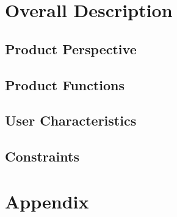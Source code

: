 \documentclass[a4paper,12pt]{report}
\begin{document}
\chapter{Overall Description}
\label{ch:Overall Description}

\section{Product Perspective}


\section{Product Functions}


\section{User Characteristics}


\section{Constraints}


\appendix
\chapter{Appendix}



\end{document}
